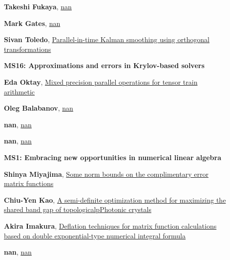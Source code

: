 \documentclass[ILAS2025-program.tex]{subfiles}
\begin{document}
\begin{description}
\begin{description}
        \item[] \hypertarget{up0340}{}\textbf{Takeshi Fukaya}, \hyperlink{down0340}{nan}
        \item[] \hypertarget{up0341}{}\textbf{Mark Gates}, \hyperlink{down0341}{nan}
        \item[] \hypertarget{up0342}{}\textbf{Sivan Toledo}, \hyperlink{down0342}{Parallel-in-time Kalman smoothing using orthogonal transformations
}
        \end{description}
    \begin{description}
    \item[] {\color{mstitle}\textbf{MS16: Approximations and errors in Krylov-based solvers}} 
    \item[] \hypertarget{up0343}{}\textbf{Eda Oktay}, \hyperlink{down0343}{Mixed precision parallel operations for tensor train arithmetic}
        \item[] \hypertarget{up0344}{}\textbf{Oleg Balabanov}, \hyperlink{down0344}{nan}
        \item[] \hypertarget{up0345}{}\textbf{nan}, \hyperlink{down0345}{nan}
        \item[] \hypertarget{up0346}{}\textbf{nan}, \hyperlink{down0346}{nan}
        \end{description}
    \begin{description}
    \item[] {\color{mstitle}\textbf{MS1: Embracing new opportunities in numerical linear algebra}} 
    \item[] \hypertarget{up0347}{}\textbf{Shinya Miyajima}, \hyperlink{down0347}{Some norm bounds on the complimentary error matrix functions}
        \item[] \hypertarget{up0348}{}\textbf{Chiu-Yen Kao}, \hyperlink{down0348}{A semi-definite optimization method for maximizing the shared band gap of topologicalpPhotonic crystals}
        \item[] \hypertarget{up0349}{}\textbf{Akira Imakura}, \hyperlink{down0349}{Deflation techniques for matrix function calculations based on double exponential-type numerical integral formula}
        \item[] \hypertarget{up0350}{}\textbf{nan}, \hyperlink{down0350}{nan}

\end{description}
\end{description}
\end{document}
